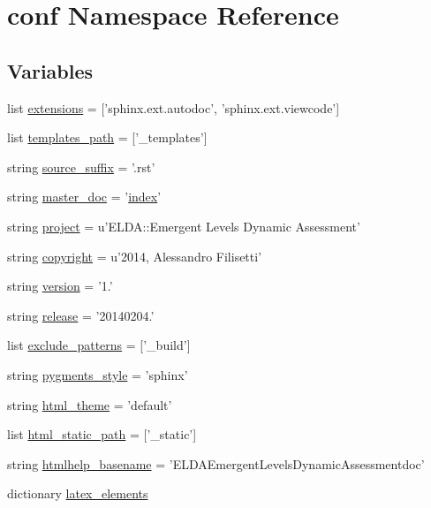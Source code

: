 \hypertarget{a00132}{\section{conf Namespace Reference}
\label{a00132}
}
\subsection*{Variables}
\begin{DoxyCompactItemize}
\item 
list \hyperlink{a00132_ae475e080536acb271a0a0efe56c3ba42}{extensions} = \mbox{[}'sphinx.\-ext.\-autodoc', 'sphinx.\-ext.\-viewcode'\mbox{]}
\item 
list \hyperlink{a00132_ae850ae634911b713e036b43894fdd525}{templates\-\_\-path} = \mbox{[}'\-\_\-templates'\mbox{]}
\item 
string \hyperlink{a00132_a10af2a769eb3bd3322e874f677e435b1}{source\-\_\-suffix} = '.rst'
\item 
string \hyperlink{a00132_a6fcd7e5236f355b1e1a55f9d95988810}{master\-\_\-doc} = '\hyperlink{a00102_a0cd6a44ffb07342cbc7e5ac33bfc9495}{index}'
\item 
string \hyperlink{a00132_a45653c983098153b78e33600e39230eb}{project} = u'E\-L\-D\-A\-::\-Emergent Levels Dynamic Assessment'
\item 
string \hyperlink{a00132_a33fa97cf51dcb25970fbf53f10159589}{copyright} = u'2014, Alessandro Filisetti'
\item 
string \hyperlink{a00132_ade15c5b54093b64d7c428ec19ca5b1cb}{version} = '1.'
\item 
string \hyperlink{a00132_a325dc746d8bf05c54d26351c35a21d90}{release} = '20140204.'
\item 
list \hyperlink{a00132_a7ad48fb6f3e9b129c02346ea0d3527c1}{exclude\-\_\-patterns} = \mbox{[}'\-\_\-build'\mbox{]}
\item 
string \hyperlink{a00132_a641130e096b26cba8a5d63ed38684de7}{pygments\-\_\-style} = 'sphinx'
\item 
string \hyperlink{a00132_a6c3bfcc1a44546c1c75ce20f55bd0fd6}{html\-\_\-theme} = 'default'
\item 
list \hyperlink{a00132_af4fb5d8851ccaade135c2668dd3ced41}{html\-\_\-static\-\_\-path} = \mbox{[}'\-\_\-static'\mbox{]}
\item 
string \hyperlink{a00132_aab7fddb2766ce3c430d8246fbfdbc7b1}{htmlhelp\-\_\-basename} = 'E\-L\-D\-A\-Emergent\-Levels\-Dynamic\-Assessmentdoc'
\item 
dictionary \hyperlink{a00132_a33619d385ad23765ac6ebb58bf82d43d}{latex\-\_\-elements}

\end{DoxyCompactItemize}
